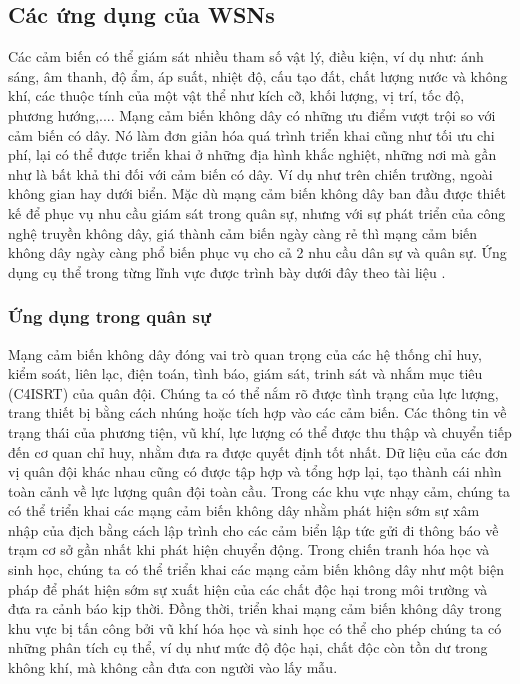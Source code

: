 \documentclass{article}
\begin{document}
\subsection{Các ứng dụng của \gls{WSNs}}
Các cảm biến có thể giám sát nhiều tham số vật lý, điều kiện, ví dụ như: ánh sáng, âm thanh, độ ẩm, áp suất, nhiệt độ, cấu tạo đất, chất lượng nước và không khí, các thuộc tính của một vật thể như kích cỡ, khối lượng, vị trí, tốc độ, phương hướng,....
Mạng cảm biến không dây có những ưu điểm vượt trội so với cảm biến có dây. Nó làm đơn giản hóa quá trình triển khai cũng như tối ưu chi phí, lại có thể được triển khai ở những địa hình khắc nghiệt, những nơi mà gần như là bất khả thi đối với cảm biến có dây. Ví dụ như trên chiến trường, ngoài không gian hay dưới biển. Mặc dù mạng cảm biến không dây ban đầu được thiết kế để phục vụ nhu cầu giám sát trong quân sự, nhưng với sự phát triển của công nghệ truyền không dây, giá thành cảm biến ngày càng rẻ thì mạng cảm biến không dây ngày càng phổ biến phục vụ cho cả 2 nhu cầu dân sự và quân sự. Ứng dụng cụ thể trong từng lĩnh vực được trình bày dưới đây theo tài liệu \cite{application}.
\subsubsection{Ứng dụng trong quân sự}
Mạng cảm biến không dây đóng vai trò quan trọng của các hệ thống chỉ huy, kiểm soát, liên lạc, điện toán, tình báo, giám sát, trinh sát và nhắm mục tiêu (C4ISRT) của quân đội.
\newline Chúng ta có thể nắm rõ được tình trạng của lực lượng, trang thiết bị bằng cách nhúng hoặc tích hợp vào các cảm biến. Các thông tin về trạng thái của phương tiện, vũ khí, lực lượng có thể được thu thập và chuyển tiếp đến cơ quan chỉ huy, nhằm đưa ra được quyết định tốt nhất. Dữ liệu của các đơn vị quân đội khác nhau cũng có được tập hợp và tổng hợp lại, tạo thành cái nhìn toàn cảnh về lực lượng quân đội toàn cầu.
\newline Trong các khu vực nhạy cảm, chúng ta có thể triển khai các mạng cảm biến không dây nhằm phát hiện sớm sự xâm nhập của địch bằng cách lập trình cho các cảm biển lập tức gửi đi thông báo về trạm cơ sở gần nhất khi phát hiện chuyển động.
\newline Trong chiến tranh hóa học và sinh học, chúng ta có thể triển khai các mạng cảm biến không dây như một biện pháp để phát hiện sớm sự xuất hiện của các chất độc hại trong môi trường và đưa ra cảnh báo kịp thời. Đồng thời, triển khai mạng cảm biến không dây trong khu vực bị tấn công bởi vũ khí hóa học và sinh học có thể cho phép chúng ta có những phân tích cụ thể, ví dụ như mức độ độc hại, chất độc còn tồn dư trong không khí, mà không cần đưa con người vào lấy mẫu.
\end{document}
